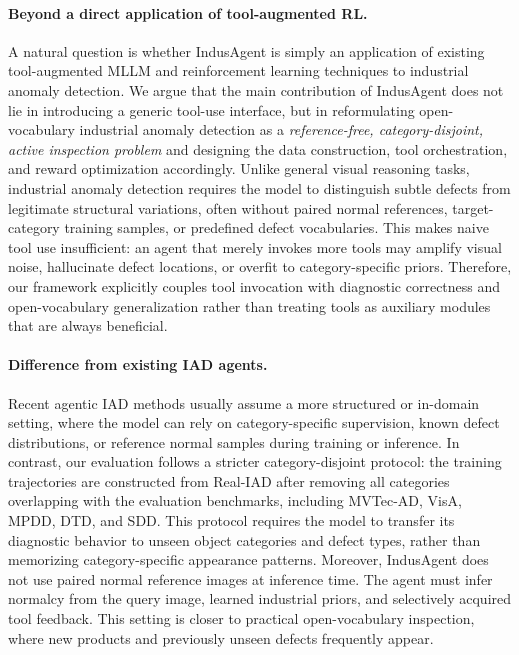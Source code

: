 \documentclass{article}
\begin{document}
{\paragraph{Beyond a direct application of tool-augmented RL.}
A natural question is whether IndusAgent is simply an application of existing tool-augmented MLLM and reinforcement learning techniques to industrial anomaly detection. 
We argue that the main contribution of IndusAgent does not lie in introducing a generic tool-use interface, but in reformulating open-vocabulary industrial anomaly detection as a \emph{reference-free, category-disjoint, active inspection problem} and designing the data construction, tool orchestration, and reward optimization accordingly. 
Unlike general visual reasoning tasks, industrial anomaly detection requires the model to distinguish subtle defects from legitimate structural variations, often without paired normal references, target-category training samples, or predefined defect vocabularies. 
This makes naive tool use insufficient: an agent that merely invokes more tools may amplify visual noise, hallucinate defect locations, or overfit to category-specific priors. 
Therefore, our framework explicitly couples tool invocation with diagnostic correctness and open-vocabulary generalization rather than treating tools as auxiliary modules that are always beneficial.

\paragraph{Difference from existing IAD agents.}
Recent agentic IAD methods usually assume a more structured or in-domain setting, where the model can rely on category-specific supervision, known defect distributions, or reference normal samples during training or inference. 
In contrast, our evaluation follows a stricter category-disjoint protocol: the training trajectories are constructed from Real-IAD after removing all categories overlapping with the evaluation benchmarks, including MVTec-AD, VisA, MPDD, DTD, and SDD. 
This protocol requires the model to transfer its diagnostic behavior to unseen object categories and defect types, rather than memorizing category-specific appearance patterns. 
Moreover, IndusAgent does not use paired normal reference images at inference time. 
The agent must infer normalcy from the query image, learned industrial priors, and selectively acquired tool feedback. 
This setting is closer to practical open-vocabulary inspection, where new products and previously unseen defects frequently appear.

}
\end{document}
